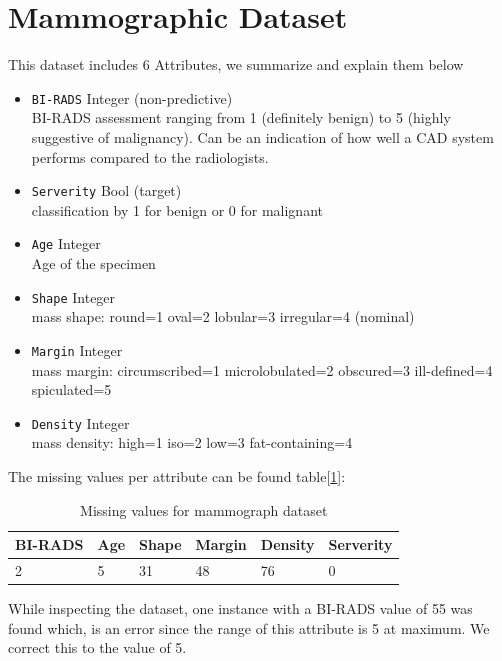 \documentclass[11pt]{article}
\begin{document}
\section{Mammographic Dataset}
This dataset includes 6 Attributes, we summarize and explain them below

\begin{multicols}{2}
\begin{itemize}
\item \texttt{BI-RADS} Integer (non-predictive)\\
 BI-RADS assessment ranging from 1 (definitely benign)
to 5 (highly suggestive of malignancy). Can be an indication of how well a CAD system performs compared to the radiologists.
\columnbreak
\item \texttt{Serverity} Bool (target) \\
classification by 1 for benign or 0 for malignant
\item \texttt{Age} Integer  \\
Age of the specimen
\end{itemize}
\begin{itemize}
\item \texttt{Shape} Integer  \\
mass shape: round=1 oval=2 lobular=3 irregular=4 (nominal) 
\item \texttt{Margin} Integer  \\
mass margin: circumscribed=1 microlobulated=2 obscured=3 ill-defined=4 spiculated=5 
\item \texttt{Density} Integer  \\
mass density: high=1 iso=2 low=3 fat-containing=4
\end{itemize}
\end{multicols}

The missing values per attribute can be found table[\ref{tab:mamm1}]:

\begin{table}[H]
\begin{tabularx}{1.0\linewidth}{XXXXXX}
\hline
BI-RADS & Age &Shape &Margin & Density & Serverity  \\
\hline
2 & 5 & 31 & 48 & 76 & 0
\end{tabularx}
\label{tab:mamm1}
\caption{Missing values for mammograph dataset}
\end{table}

While inspecting the dataset, one instance with a BI-RADS value of 55 was found which, is an error since the range of this attribute is 5 at maximum. We correct this to the value of 5. 
\end{document}
